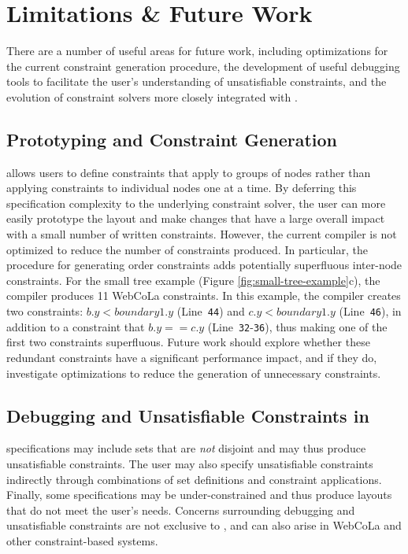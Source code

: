 \section{Limitations \& Future Work}
There are a number of useful areas for future work, including optimizations
for the current constraint generation procedure, the development of useful debugging
tools to facilitate the user's understanding of unsatisfiable constraints,
and the evolution of constraint solvers more closely integrated with \projectname.


\vspace{-5px}
\subsection{Prototyping and Constraint Generation}
\projectname allows users to define constraints that apply
to groups of nodes rather than applying constraints to individual
nodes one at a time. By deferring this specification complexity to the underlying constraint
solver, the user can more easily prototype the layout and make changes that
have a large overall impact with a small number of written constraints. However, 
the current \projectname compiler is not optimized to reduce the
number of constraints produced. In particular, the procedure for generating
order constraints adds potentially superfluous inter-node 
constraints. For the small tree example (Figure \ref{fig:small-tree-example}c), 
the \projectname compiler produces 11 WebCoLa constraints.
In this example, the \projectname compiler creates two constraints: $b.y < boundary1.y$ (Line~\texttt{44}) 
and $c.y < boundary1.y$ (Line~\texttt{46}), in addition to a
constraint that $b.y == c.y$ (Line~\texttt{32}-\texttt{36}), thus 
making one of the first two constraints superfluous. 
Future work should explore whether these redundant constraints have a 
significant performance impact, and if they do, investigate 
optimizations to reduce the generation of unnecessary constraints.

\vspace{-7px}
\subsection{Debugging and Unsatisfiable Constraints in \projectname}
\projectname specifications may include sets that 
are \emph{not} disjoint and may thus produce unsatisfiable constraints. 
The user may also specify unsatisfiable constraints indirectly through
combinations of set definitions and constraint applications. 
Finally, some specifications may be under-constrained and thus produce
layouts that do not meet the user's needs. Concerns surrounding
debugging and unsatisfiable constraints are not exclusive to \projectname, 
and can also arise in WebCoLa and other constraint-based systems. 

